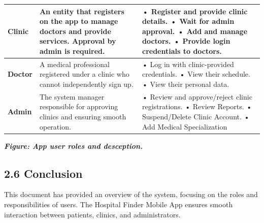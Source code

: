 \documentclass[12pt]{report}
\begin{document}
\begin{longtable}{|p{3cm}|p{6cm}|p{6cm}|}
	\hspace*{0.9cm}\textbf{Clinic}                                                                             &
	An entity that registers on the app to manage doctors and provide services. Approval by admin is required. &
	• Register and provide clinic details.\newline
	• Wait for admin approval.\newline
	• Add and manage doctors.\newline
	• Provide login credentials to doctors.                                                                                                                                                                                               \\
	\hline


	\hspace*{0.85cm}\textbf{Doctor}                                                                            & A medical professional registered under a clinic who cannot independently sign up.  &
	• Log in with clinic-provided credentials.\newline
	• View their schedule.\newline
	• View their personal data.                                                                                                                                                                                                           \\
	\hline

	\hspace*{0.85cm}\textbf{Admin}                                                                             & The system manager responsible for approving clinics and ensuring smooth operation. &
	• Review and approve/reject clinic registrations.\newline
	• Review Reports.\newline
	• Suspend/Delete Clinic Account.         
	• Add Medical Specialization                                                                                                                                                             \\
	\hline
\end{longtable}
\begin{center}
	\textit{\textbf{Figure: App user roles and desception.}}
\end{center}


\subsection*{2.6 Conclusion}
This document has provided an overview of the system, focusing on the roles and responsibilities of users. The Hospital Finder Mobile App ensures smooth interaction between patients, clinics, and administrators.
\vspace{0.5cm}
\end{document}
